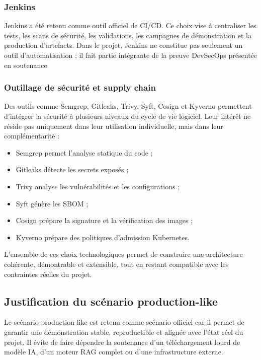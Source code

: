 \subsubsection{Jenkins}

Jenkins a été retenu comme outil officiel de CI/CD. Ce choix vise à centraliser les tests, les scans de sécurité, les validations, les campagnes de démonstration et la production d’artefacts. Dans le projet, Jenkins ne constitue pas seulement un outil d’automatisation ; il fait partie intégrante de la preuve DevSecOps présentée en soutenance.

\subsubsection{Outillage de sécurité et supply chain}

Des outils comme Semgrep, Gitleaks, Trivy, Syft, Cosign et Kyverno permettent d’intégrer la sécurité à plusieurs niveaux du cycle de vie logiciel. Leur intérêt ne réside pas uniquement dans leur utilisation individuelle, mais dans leur complémentarité :

\begin{itemize}
    \item Semgrep permet l’analyse statique du code ;
    \item Gitleaks détecte les secrets exposés ;
    \item Trivy analyse les vulnérabilités et les configurations ;
    \item Syft génère les SBOM ;
    \item Cosign prépare la signature et la vérification des images ;
    \item Kyverno prépare des politiques d’admission Kubernetes.
\end{itemize}

L’ensemble de ces choix technologiques permet de construire une architecture cohérente, démontrable et extensible, tout en restant compatible avec les contraintes réelles du projet.

\subsection{Justification du scénario production-like}

Le scénario production-like est retenu comme scénario officiel car il permet de garantir une démonstration stable, reproductible et alignée avec l’état réel du projet. Il évite de faire dépendre la soutenance d’un téléchargement lourd de modèle IA, d’un moteur RAG complet ou d’une infrastructure externe.

